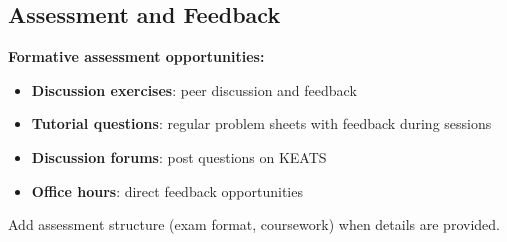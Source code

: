 \bigseparator

\subsection*{Assessment and Feedback}

\textbf{Formative assessment opportunities:}
\begin{itemize}
  \item \textbf{Discussion exercises}: peer discussion and feedback
  \item \textbf{Tutorial questions}: regular problem sheets with feedback during sessions
  \item \textbf{Discussion forums}: post questions on KEATS
  \item \textbf{Office hours}: direct feedback opportunities
\end{itemize}

\TODO{} Add assessment structure (exam format, coursework) when details are provided.

\bigseparator
